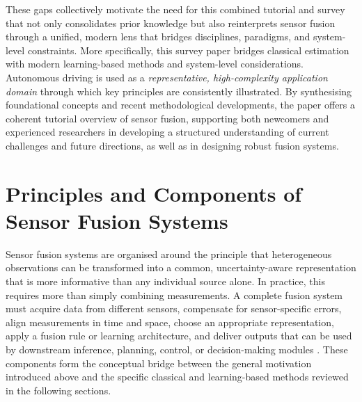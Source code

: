 \documentclass{ieeeaccess}
\begin{document}


These gaps collectively motivate the need for this combined tutorial and survey that not only consolidates prior knowledge but also reinterprets sensor fusion through a unified, modern lens that bridges disciplines, paradigms, and system-level constraints. More specifically, this survey paper bridges classical estimation with modern learning-based methods and system-level considerations. Autonomous driving is used as a \emph{representative, high-complexity application domain} through which key principles are consistently illustrated. By synthesising foundational concepts and recent methodological developments, the paper offers a coherent tutorial overview of sensor fusion, supporting both newcomers and experienced researchers in developing a structured understanding of current challenges and future directions, as well as in designing robust fusion systems.

%
%
\section{Principles and Components of Sensor Fusion Systems}
\label{sec:Principles}
%
%

Sensor fusion systems are organised around the principle that heterogeneous observations can be transformed into a common, uncertainty-aware representation that is more informative than any individual source alone. In practice, this requires more than simply combining measurements. A complete fusion system must acquire data from different sensors, compensate for sensor-specific errors, align measurements in time and space, choose an appropriate representation, apply a fusion rule or learning architecture, and deliver outputs that can be used by downstream inference, planning, control, or decision-making modules \cite{hall_introduction_1997,luo_multisensor_1989,liggins_handbook_2009,khaleghi_multisensor_2013}. These components form the conceptual bridge between the general motivation introduced above and the specific classical and learning-based methods reviewed in the following sections.
\end{document}
